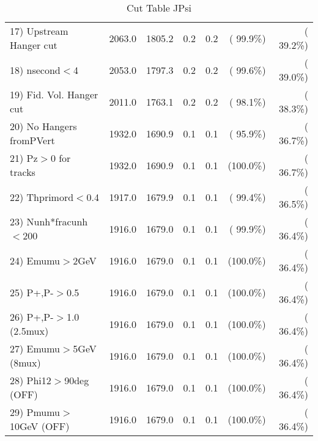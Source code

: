 \begin{table}[h!]
\begin{tabular}{||l||r|r|r|r|r|r||}
 17) Upstream Hanger cut  &       2063.0 &       1805.2 &          0.2 &          0.2 & ( 99.9\%) & ( 39.2\%) \\
 18) nsecond$<$4          &       2053.0 &       1797.3 &          0.2 &          0.2 & ( 99.6\%) & ( 39.0\%) \\
 19) Fid. Vol. Hanger cut &       2011.0 &       1763.1 &          0.2 &          0.2 & ( 98.1\%) & ( 38.3\%) \\
 20) No Hangers fromPVert &       1932.0 &       1690.9 &          0.1 &          0.1 & ( 95.9\%) & ( 36.7\%) \\
 21) Pz$>$0 for tracks    &       1932.0 &       1690.9 &          0.1 &          0.1 & (100.0\%) & ( 36.7\%) \\
 22) Thprimord$<$0.4      &       1917.0 &       1679.9 &          0.1 &          0.1 & ( 99.4\%) & ( 36.5\%) \\
 23) Nunh*fracunh$<$200   &       1916.0 &       1679.0 &          0.1 &          0.1 & ( 99.9\%) & ( 36.4\%) \\
 24) Emumu$>$2GeV         &       1916.0 &       1679.0 &          0.1 &          0.1 & (100.0\%) & ( 36.4\%) \\
 25) P+,P-$>$0.5          &       1916.0 &       1679.0 &          0.1 &          0.1 & (100.0\%) & ( 36.4\%) \\
 26) P+,P-$>$1.0 (2.5mux) &       1916.0 &       1679.0 &          0.1 &          0.1 & (100.0\%) & ( 36.4\%) \\
 27) Emumu$>$5GeV  (8mux) &       1916.0 &       1679.0 &          0.1 &          0.1 & (100.0\%) & ( 36.4\%) \\
 28) Phi12$>$90deg  (OFF) &       1916.0 &       1679.0 &          0.1 &          0.1 & (100.0\%) & ( 36.4\%) \\
 29) Pmumu$>$10GeV  (OFF) &       1916.0 &       1679.0 &          0.1 &          0.1 & (100.0\%) & ( 36.4\%) \\
 \hline
 \hline
 \end{tabular}
 \caption{Cut Table  JPsi     }
 \label{tab-cutcohjpsi-mumu_jpsi}
 \end{table}
